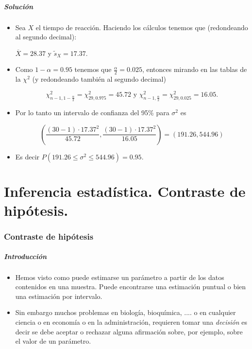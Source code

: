 \begin{frame}
\frametitle{Solución}

\begin{itemize}
\item  Sea $X$ el tiempo de reacción. Haciendo los cálculos tenemos que
(redondeando al segundo decimal):


$\overline{X}= 28.37$ y $\tilde{s}_{X}=17.37.$
\item 
Como $1-\alpha=0.95$ tenemos que  $\frac{\alpha}{2}=0.025$, entonces mirando en las tablas
de la $\chi^2$ (y redondeando también al segundo decimal)

$$\chi_{n-1,1-\frac{\alpha}{2}}^2= \chi_{29,0.975}^2=45.72 \mbox{ y }
\chi^2_{n-1,\frac{\alpha}{2}}= \chi_{29,0.025}^2=16.05.$$
\item 
Por lo tanto un intervalo de confianza del 95\% para $\sigma^2$ es

$$\left(\frac{(30-1)\cdot 17.37^2}{45.72},\frac{(30-1)\cdot 17.37^2}{16.05}\right)=
\left(191.26,544.96\right)$$
\item 
Es decir $P(191.26\leq \sigma^2\leq
544.96)=0.95.$
\end{itemize}
\end{frame}


\part{Inferencia estadística. Contraste de hipótesis.}

\frame{\partpage}

\section{Contraste de hipótesis}
\begin{frame}

\frametitle{Introducción}
\begin{itemize}
\item Hemos visto como puede estimarse un parámetro  a partir de los datos contenidos en una muestra.
     Puede encontrarse una  estimación puntual o bien una estimación por intervalo.
\item  Sin embargo muchos problemas en biología, bioquímica, .... o en cualquier ciencia o en  economía o en la administración, requieren tomar una \emph{decisión} es decir se
     debe aceptar o rechazar  alguna afirmación sobre, por ejemplo,
     sobre el valor de un parámetro.
\end{itemize}
\end{frame}

